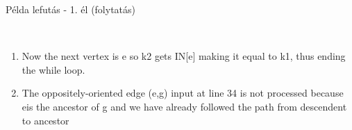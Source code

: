 \begin{frame}{Példa lefutás - 1. él (folytatás)}
\begin{tikzpicture}
\end{tikzpicture}
\\[0.5em]
\small
\begin{enumerate}
  \item Now the next vertex is e so k2 gets IN[e] making it equal to k1, thus ending the while loop.
  \item The oppositely-oriented edge (e,g) input at line 34 is not processed because eis the ancestor of g and we have already followed the path from descendent to ancestor
\end{enumerate}
\end{frame}

